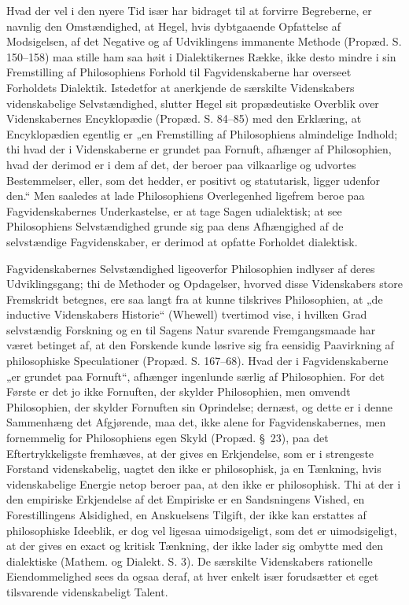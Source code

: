 \documentclass[12pt,a4paper]{book}
\begin{document}
Hvad der vel i den nyere Tid især har bidraget til at forvirre
Begreberne, er navnlig den Omstændighed, at Hegel, hvis dybtgaaende
Opfattelse af Modsigelsen, af det Negative og af Udviklingens
immanente Methode (Propæd. S. 150--158) maa stille ham saa høit i
Dialektikernes Række, ikke desto mindre i sin Fremstilling af
Philosophiens Forhold til Fagvidenskaberne har overseet Forholdets
Dialektik. Istedetfor at anerkjende de særskilte Videnskabers
videnskabelige Selvstændighed, slutter Hegel sit propædeutiske
Overblik over Videnskabernes Encyklopædie (Propæd. S. 84--85) med den
Erklæring, at Encyklopædien egentlig er „en Fremstilling af
Philosophiens almindelige Indhold; thi hvad der i Videnskaberne
er grundet paa Fornuft, afhænger af Philosophien, hvad der derimod er
i dem af det, der beroer paa vilkaarlige og udvortes Bestemmelser,
eller, som det hedder, er positivt og statutarisk, ligger udenfor
den.“ Men saaledes at lade Philosophiens Overlegenhed ligefrem beroe
paa Fagvidenskabernes Underkastelse, er at tage Sagen udialektisk; at
see Philosophiens Selvstændighed grunde sig paa dens Afhængighed af de
selvstændige Fagvidenskaber, er derimod at opfatte Forholdet
dialektisk.

Fagvidenskabernes Selvstændighed ligeoverfor Philosophien indlyser af
deres Udviklingsgang; thi de Methoder og Opdagelser, hvorved disse
Videnskabers store Fremskridt betegnes, ere saa langt fra at kunne
tilskrives Philosophien, at „de inductive Videnskabers Historie“
(Whewell) tvertimod vise, i hvilken Grad selvstændig Forskning og en
til Sagens Natur svarende Fremgangsmaade har været betinget af, at den
Forskende kunde løsrive sig fra eensidig Paavirkning af philosophiske
Speculationer (Propæd. S. 167--68). Hvad der i Fagvidenskaberne „er
grundet paa Fornuft“, afhænger ingenlunde særlig af Philosophien. For
det Første er det jo ikke Fornuften, der skylder Philosophien, men
omvendt Philosophien, der skylder Fornuften sin Oprindelse; dernæst,
og dette er i denne Sammenhæng det Afgjørende, maa det, ikke alene for
Fagvidenskabernes, men fornemmelig for Philosophiens egen Skyld
(Propæd. §~23), paa det Eftertrykkeligste fremhæves, at der gives en
Erkjendelse, som er i strengeste Forstand videnskabelig, uagtet den
ikke er philosophisk, ja en Tænkning, hvis videnskabelige Energie
netop beroer paa, at den ikke er philosophisk. Thi at der i den
empiriske Erkjendelse af det Empiriske er en Sandsningens Vished, en
Forestillingens Alsidighed, en Anskuelsens Tilgift, der ikke kan
erstattes af philosophiske Ideeblik, er dog vel ligesaa uimodsigeligt,
som det er uimodsigeligt, at der gives en exact og kritisk Tænkning,
der ikke lader sig ombytte med den dialektiske (Mathem. og Dialekt.
S. 3). De særskilte Videnskabers rationelle
Eiendommelighed sees da ogsaa deraf, at hver enkelt især forudsætter
et eget tilsvarende videnskabeligt Talent.
\end{document}
